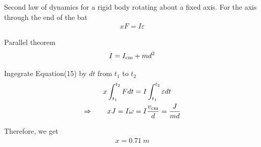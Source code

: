 \documentclass[12pt,a4paper]{article}
\begin{document}
Second law of dynamics for a rigid body rotating about a fixed axis. For the axis through the end of the bat
\begin{align}
	xF = I\varepsilon
\end{align}

Parallel theorem
\begin{align}
I = I_{\rm cm} + md^2
\end{align}

Ingegrate Equation(15) by $dt$ from $t_1$ to $t_2$
\begin{align*}
	x\int_{t_1}^{t_2} F dt &= I \int_{t_1}^{t_2} \varepsilon dt\\
\Rightarrow \qquad xJ = I\omega &= I\frac{v_{\rm cm}}{d} = \frac{J}{md}
\end{align*}

Therefore, we get
\begin{align}
	x = 0.71\ m
\end{align}
\end{document}
